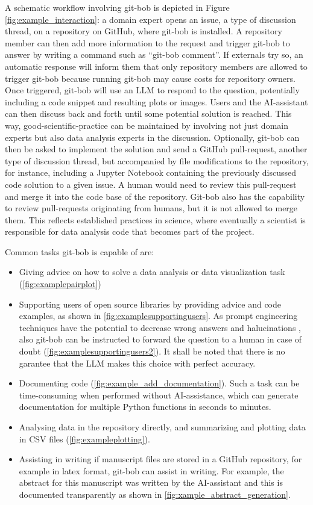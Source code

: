 \documentclass[sn-mathphys-num]{sn-jnl}%
\theoremstyle{thmstyleone}%
\theoremstyle{thmstyletwo}%
\theoremstyle{thmstylethree}%
\begin{document}
A schematic workflow involving git-bob is depicted in Figure \ref{fig:example_interaction}: a domain expert opens an issue, a type of discussion thread, on a repository on GitHub, where git-bob is installed. A repository member can then add more information to the request and trigger git-bob to answer by writing a command such as ``git-bob comment''. If externals try so, an automatic response will inform them that only repository members are allowed to trigger git-bob because running git-bob may cause costs for repository owners. Once triggered, git-bob will use an LLM to respond to the question, potentially including a code snippet and resulting plots or images. Users and the AI-assistant can then discuss back and forth until some potential solution is reached. This way, good-scientific-practice can be maintained by involving not just domain experts but also data analysis experts in the discussion. Optionally, git-bob can then be asked to implement the solution and send a GitHub pull-request, another type of discussion thread, but accompanied by file modifications to the repository, for instance, including a Jupyter Notebook containing the previously discussed code solution to a given issue. A human would need to review this pull-request and merge it into the code base of the repository. Git-bob also has the capability to review pull-requests originating from humans, but it is not allowed to merge them. This reflects established practices in science, where eventually a scientist is responsible for data analysis code that becomes part of the project. 

Common tasks git-bob is capable of are: \begin{itemize}
  \item Giving advice on how to solve a data analysis or data visualization task (\ref{fig:examplepairplot})
  \item Supporting users of open source libraries by providing advice and code examples, as shown in \ref{fig:examplesupportingusers}. As prompt engineering techniques have the potential to decrease wrong answers and halucinations \cite{yin2023largelanguagemodelsknow}, also git-bob can be instructed to forward the question to a human in case of doubt (\ref{fig:examplesupportingusers2}). It shall be noted that there is no garantee that the LLM makes this choice with perfect accuracy. 
  \item Documenting code (\ref{fig:example_add_documentation}). Such a task can be time-consuming when performed without AI-assistance, which can generate documentation for multiple Python functions in seconds to minutes. 
  \item Analysing data in the repository directly, and summarizing and plotting data in CSV files (\ref{fig:exampleplotting}). 
  \item Assisting in writing if manuscript files are stored in a GitHub repository, for example in latex format, git-bob can assist in writing. For example, the abstract for this manuscript was written by the AI-assistant and this is documented transparently as shown in \ref{fig:xample_abstract_generation}.
  \end{itemize}
\end{document}
